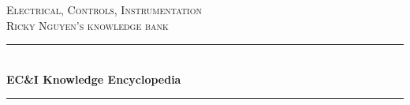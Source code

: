 \begin{titlepage} %
	\newcommand{\HRule}{\rule{\linewidth}{0.5mm}} %

	\center %

	\textsc{\Large Electrical, Controls, Instrumentation}\\[0.5cm]
	\textsc{\Large Ricky Nguyen's knowledge bank}\\[0.5cm] %


	\HRule\\[0.4cm]

	{\huge\bfseries EC\&I Knowledge Encyclopedia}\\[0.4cm] %

	\HRule\\[1.5cm]

	\begin{table}[h!]
        \begin{center}
        \begin{tabular}{ |l|c|p{4cm}| }


\end{tabular}
\end{center}
\end{table}
\end{titlepage}
